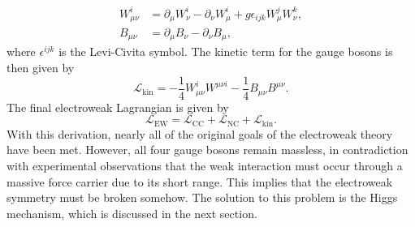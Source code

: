 \begin{align}
  W_{\mu\nu}^{i} &= \partial_{\mu}W_{\nu}^{i} - \partial_{\nu}W_{\mu}^{i} + g\epsilon_{ijk}W_{\mu}^{j}W_{\nu}^{k}, \\
  B_{\mu\nu} &= \partial_{\mu}B_{\nu} - \partial_{\nu}B_{\mu},
\end{align}
where $\epsilon^{ijk}$ is the Levi-Civita symbol. The kinetic term for the gauge bosons is then given by
\begin{equation}
  \mathcal{L}_{\mathrm{kin}} = -\frac{1}{4}W_{\mu\nu}^{i}W^{\mu\nu i} - \frac{1}{4}B_{\mu\nu}B^{\mu\nu}.
  \label{eq:ew_kinetic_lagrangian}
\end{equation}
The final electroweak Lagrangian is given by
\begin{equation}
  \mathcal{L}_{\mathrm{EW}} = \mathcal{L}_{\mathrm{CC}} + \mathcal{L}_{\mathrm{NC}} + \mathcal{L}_{\mathrm{kin}}.
  \label{eq:ew_lagrangian_final}
\end{equation}
With this derivation, nearly all of the original goals of the electroweak theory have been met. However, all four gauge bosons remain massless, in contradiction with experimental observations that the weak interaction must occur through a massive force carrier due to its short range. This implies that the electroweak symmetry must be broken somehow. The solution to this problem is the Higgs mechanism, which is discussed in the next section.



